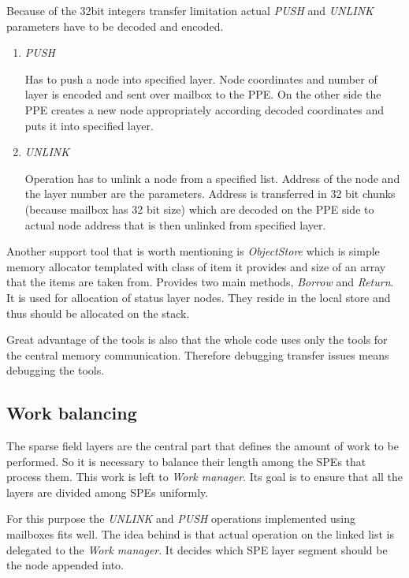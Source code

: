 \par
Because of the 32bit integers transfer limitation actual \emph{PUSH} and \emph{UNLINK} parameters have to be decoded and encoded.

\begin{enumerate}
\item \emph{PUSH}
\par
Has to push a node into specified layer.
Node coordinates and number of layer is encoded and sent over mailbox to the PPE.
On the other side the PPE creates a new node appropriately according decoded coordinates and puts it into specified layer.

\item \emph{UNLINK}
\par
Operation has to unlink a node from a specified list.
Address of the node and the layer number are the parameters.
Address is transferred in 32 bit chunks (because mailbox has 32 bit size) which are decoded on the PPE side to actual node address that is then unlinked from specified layer.
\end{enumerate}

\par
Another support tool that is worth mentioning is \mbox{\emph{ObjectStore}} which is simple memory allocator templated with class of item it provides and size of an array that the items are taken from.
Provides two main methods, \emph{Borrow} and \emph{Return}.
It is used for allocation of status layer nodes.
They reside in the local store and thus should be allocated on the stack.

\par
Great advantage of the tools is also that the whole code uses only the tools for the central memory communication.
Therefore debugging transfer issues means debugging the tools.

\subsection{Work balancing}

\par
The sparse field layers are the central part that defines the amount of work to be performed.
So it is necessary to balance their length among the SPEs that process them.
This work is left to \emph{Work manager}.
Its goal is to ensure that all the layers are divided among SPEs uniformly.

\par
For this purpose the \emph{UNLINK} and \emph{PUSH} operations implemented using mailboxes fits well.
The idea behind is that actual operation on the linked list is delegated to the \emph{Work manager}.
It decides which SPE layer segment should be the node appended into.

